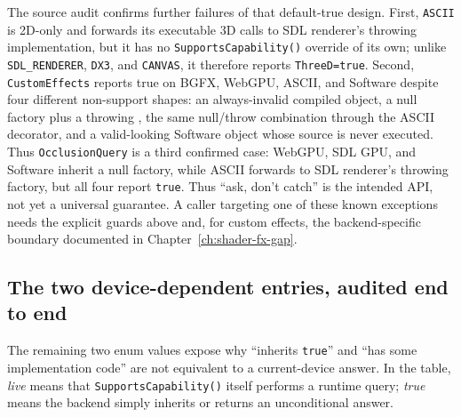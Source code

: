The source audit confirms further failures of that default-true design. First,
\texttt{ASCII} is 2D-only and forwards its executable 3D calls to SDL renderer's throwing
implementation, but it has no \texttt{SupportsCapability()} override of its own; unlike
\texttt{SDL\_RENDERER}, \texttt{DX3}, and \texttt{CANVAS}, it therefore reports
\texttt{ThreeD=true}. Second, \texttt{CustomEffects} reports true on BGFX, WebGPU, ASCII, and
Software despite four different non-support shapes: an always-invalid compiled object, a null
factory plus a throwing , the same null/throw combination through the
ASCII decorator, and a valid-looking Software object whose source is never executed. Thus
\texttt{OcclusionQuery} is a third confirmed case: WebGPU, SDL GPU, and Software inherit a
null factory, while ASCII forwards to SDL renderer's throwing factory, but all four report
\texttt{true}. Thus ``ask, don't catch'' is the intended API, not yet a universal guarantee.
A caller targeting one of these known exceptions needs the explicit guards above and, for
custom effects, the backend-specific boundary documented in
Chapter~\ref{ch:shader-fx-gap}.

\subsection{The two device-dependent entries, audited end to end}

The remaining two enum values expose why ``inherits \texttt{true}'' and ``has some
implementation code'' are not equivalent to a current-device answer. In the table,
\emph{live} means that \texttt{SupportsCapability()} itself performs a runtime query;
\emph{true} means the backend simply inherits or returns an unconditional answer.

